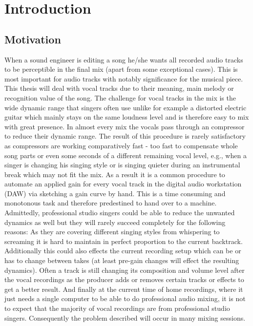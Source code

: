 \chapter{Introduction}
\label{chapter:introduction}

\section{Motivation}

When a sound engineer is editing a song he/she wants all recorded audio tracks to be perceptible in the final mix (apart from some exceptional cases). This is most important for audio tracks with notably significance for the musical piece. This thesis will deal with vocal tracks due to their meaning, main melody or recognition value of the song. The challenge for vocal tracks in the mix is the wide dynamic range that singers often use unlike for example a distorted electric guitar which mainly stays on the same loudness level and is therefore easy to mix with great presence. In almost every mix the vocals pass through an compressor to reduce their dynamic range. The result of this procedure is rarely satisfactory as compressors are working comparatively fast - too fast to compensate whole song parts or even some seconds of a different remaining vocal level, e.g., when a singer is changing his singing style or is singing quieter during an instrumental break which may not fit the mix. As a result it is a common procedure to automate an applied gain for every vocal track in the digital audio workstation (DAW) via sketching a gain curve by hand. This is a time consuming and monotonous task and therefore predestined to hand over to a machine.\\
Admittedly, professional studio singers could be able to reduce the unwanted dynamics as well but they will rarely succeed completely for the following reasons: As they are covering different singing styles from whispering to screaming it is hard to maintain in perfect proportion to the current backtrack. Additionally this could also effects the current recording setup which can be or has to change between takes (at least pre-gain changes will effect the resulting dynamics). Often a track is still changing its composition and volume level after the vocal recordings as the producer adds or removes certain tracks or effects to get a better result. And finally at the current time of home recordings, where it just needs a single computer to be able to do professional audio mixing, it is not to expect that the majority of vocal recordings are from professional studio singers. Consequently the problem described will occur in many mixing sessions.\\


